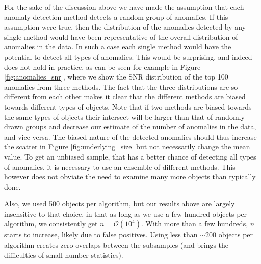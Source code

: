 \documentclass[fleqn,usenatbib]{mnras}
\begin{document}
{For the sake of the discussion above we have made the assumption that each anomaly detection method detects a random group of anomalies. If this assumption were true, then the distribution of the anomalies detected by any single method would have been representative of the overall distribution of anomalies in the data. In such a case each single method would have the potential to detect all types of anomalies.  This would be surprising, and indeed does not hold in practice, as can be seen for example in Figure \ref{fig:anomalies_snr}, where we show the SNR distribution of the top 100 anomalies from three methods. The fact that the three distributions are so different from each other makes it clear that the different methods are biased towards different types of objects. Note that if two methods are biased towards the same types of objects their intersect will be larger than that of randomly drawn groups and decrease our estimate of the number of anomalies in the data, and vice versa. The biased nature of the detected anomalies should thus increase the scatter in Figure \ref{fig:underlying_size} but not necessarily change the mean value. To get an unbiased sample, that has a better chance of detecting all types of anomalies, it is necessary to use an ensemble of  different methods. This however does not obviate the need to examine many more objects than typically done. 

Also, we used 500 objects per algorithm, but our results above are largely insensitive to that choice, in that as long as we use a few hundred objects per algorithm, we consistently get $n = \mathcal{O} (10^4)$. With more than a few hundreds, $n$ starts to increase, likely due to false positives. Using less than $\sim200$ objects per algorithm creates zero overlaps between the subsamples (and brings the difficulties of small number statistics).

}
\end{document}
